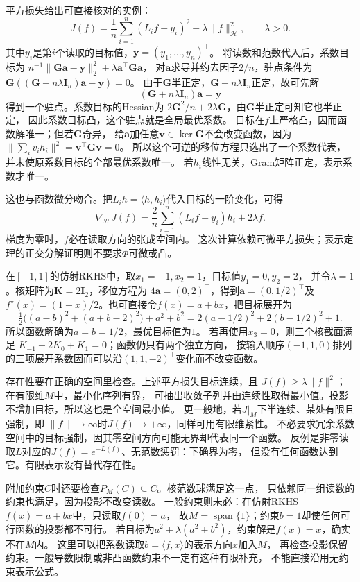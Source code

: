 平方损失给出可直接核对的实例：
\[
 J(f)=\frac1n\sum_{i=1}^n(L_if-y_i)^2+\lambda\lVert f\rVert_{\mathcal H}^2,
 \qquad\lambda>0.
\]
其中$y_i$是第$i$个读取的目标值，$\bm y=(y_1,\ldots,y_n)^\top$。
将读数和范数代入后，系数目标为
$n^{-1}\lVert\bm G\bm a-\bm y\rVert_2^2+\lambda\bm a^\top\bm G\bm a$，
对$\bm a$求导并约去因子$2/n$，驻点条件为
$\bm G((\bm G+n\lambda\bm I_n)\bm a-\bm y)=0$。
由于$\bm G$半正定，$\bm G+n\lambda\bm I_n$正定，故可先解
\[
 (\bm G+n\lambda\bm I_n)\bm a=\bm y
\]
得到一个驻点。系数目标的Hessian为
$2\bm G^2/n+2\lambda\bm G$，由$\bm G$半正定可知它也半正定，
因此系数目标凸，这个驻点就是全局最优系数。
目标在$f$上严格凸，因而函数解唯一；但若$\bm G$奇异，
给$\bm a$加任意$\bm v\in\ker\bm G$不会改变函数，因为
$\lVert\sum_i v_i h_i\rVert^2=\bm v^\top\bm G\bm v=0$。
所以这个可逆的移位方程只选出了一个系数代表，并未使原系数目标的全部最优系数唯一。
若$h_i$线性无关，Gram矩阵正定，表示系数才唯一。

这也与函数微分吻合。把$L_i h=\langle h,h_i\rangle$代入目标的一阶变化，可得
\[
 \nabla_{\mathcal H}J(f)
 =\frac2n\sum_{i=1}^n(L_if-y_i)h_i+2\lambda f.
\]
梯度为零时，$f$必在读取方向的张成空间内。
这次计算依赖可微平方损失；表示定理的正交分解证明则不要求$\Phi$可微或凸。

\begin{example}[两个点值的有限求解]
\label{ex:functional-two-readings}
在$[-1,1]$的仿射RKHS中，取$x_1=-1,x_2=1$，目标值$y_1=0,y_2=2$，
并令$\lambda=1$。核矩阵为$\bm K=2\bm I_2$，移位方程为
$4\bm a=(0,2)^\top$，得到$\bm a=(0,1/2)^\top$及
$f^\star(x)=(1+x)/2$。也可直接令$f(x)=a+bx$，把目标展开为
\[
 \tfrac12\bigl((a-b)^2+(a+b-2)^2\bigr)+a^2+b^2
 =2(a-1/2)^2+2(b-1/2)^2+1.
\]
所以函数解确为$a=b=1/2$，最优目标值为$1$。
若再使用$x_3=0$，则三个核截面满足
$K_{-1}-2K_0+K_1=0$；函数仍只有两个独立方向，
按输入顺序$(-1,1,0)$排列的三项展开系数因而可以沿$(1,1,-2)^\top$变化而不改变函数。
\end{example}

存在性要在正确的空间里检查。上述平方损失目标连续，且
$J(f)\geq\lambda\lVert f\rVert^2$；在有限维$M$中，最小化序列有界，
可抽出收敛子列并由连续性取得最小值。投影不增加目标，所以这也是全空间最小值。
更一般地，若$J|_M$下半连续、某处有限且强制，即
$\lVert f\rVert\to\infty$时$J(f)\to+\infty$，同样可用有限维紧性。
不必要求冗余系数空间中的目标强制，因其零空间方向可能无界却代表同一个函数。
反例是非零读取$L$对应的$J(f)=e^{-L(f)}$、无范数惩罚：下确界为零，
但没有任何函数达到它。有限表示没有替代存在性。

附加约束$C$时还要检查$P_M(C)\subseteq C$。核范数球满足这一点，
只依赖同一组读数的约束也满足，因为投影不改变读数。
一般约束则未必：在仿射RKHS$f(x)=a+bx$中，只读取$f(0)=a$，
故$M=\operatorname{span}\{1\}$；约束$b=1$却使任何可行函数的投影都不可行。
若目标为$a^2+\lambda(a^2+b^2)$，约束解是$f(x)=x$，确实不在$M$内。
这里可以把系数读取$b=\langle f,x\rangle$的表示方向$x$加入$M$，
再检查投影保留约束。一般导数限制或非凸函数约束不一定有这种有限补充，
不能直接沿用无约束表示公式。

